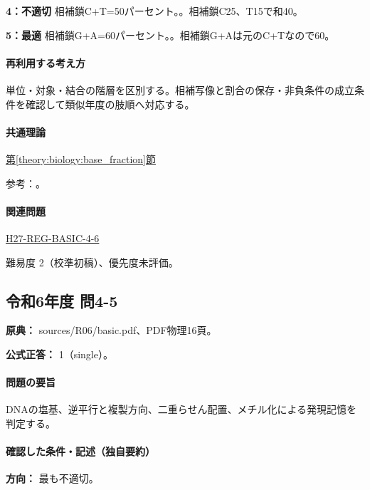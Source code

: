 \noindent\textbf{4：不適切} 相補鎖C+T=\allowbreak{}50パーセント。。相補鎖C25、T15で和40。\par

\noindent\textbf{5：最適} 相補鎖G+A=\allowbreak{}60パーセント。。相補鎖G+Aは元のC+Tなので60。\par

\paragraph{再利用する考え方} 単位・対象・結合の階層を区別する。相補写像と割合の保存・非負条件の成立条件を確認して類似年度の肢順へ対応する。

\paragraph{共通理論} \hyperref[theory:biology:base_fraction]{第\ref*{theory:biology:base_fraction}節}

\par 参考：\cite{nhgri_dna}。

\paragraph{関連問題} \hyperref[q:h27-reg-basic-4-6]{H27-REG-BASIC-4-6}

\par 難易度 2（校準初稿）、優先度未評価。

\subsection{令和6年度 問4-5}
\label{q:r06-reg-basic-4-5}

\noindent\textbf{原典：} sources/R06/basic.pdf、PDF物理16頁。

\textbf{公式正答：} 1（single）。

\paragraph{問題の要旨} DNAの塩基、逆平行と複製方向、二重らせん配置、メチル化による発現記憶を判定する。

\paragraph{確認した条件・記述（独自要約）}\mbox{}\par

\noindent\textbf{方向：} 最も不適切。\par

